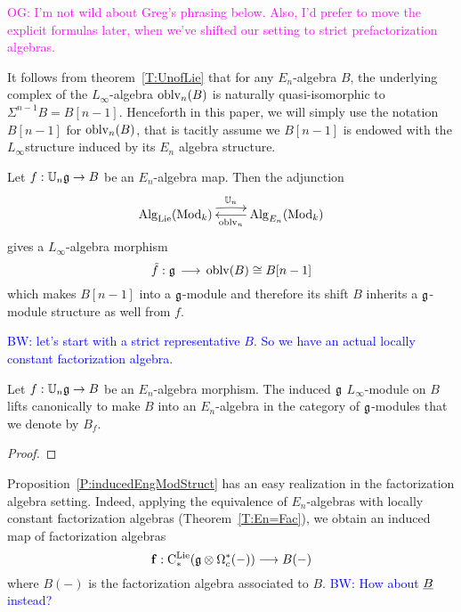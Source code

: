 \documentclass[11pt]{amsart}
\numberwithin{equation}{section}
\def\brian{\textcolor{blue}{BW: }\textcolor{blue}}
\def\owen{\textcolor{magenta}{OG: }\textcolor{magenta}}
\begin{document}
\owen{I'm not wild about Greg's phrasing below. Also, I'd prefer to move the explicit formulas later, when we've shifted our setting to strict prefactorization algebras.}


\begin{rmk}
It follows from theorem~\ref{T:UnofLie} that for any $E_n$-algebra $B$, 
the underlying complex of the $L_\infty$-algebra ${\rm oblv}_n(B)$ is naturally quasi-isomorphic to $\Sigma^{n-1}B = B[n-1]$. 
Henceforth in this paper, we will simply use the notation $B[n-1]$ for ${\rm oblv}_n(B)$, 
that is tacitly assume we $B[n-1]$ is endowed with the $L_\infty$structure induced by its $E_n$ algebra structure.
\end{rmk}

Let  $f:\mathbb U_n \mathfrak g \to B$ be an $E_n$-algebra map. Then the adjunction 
\[
\xymatrix{\Alg_\Lie(\Mod_k) \ar@/^/[r]^{\UU_n} & \ar[l]^{\oblv_n}  \Alg_{E_n}(\Mod_k)}
\]
gives a $L_\infty$-algebra morphism 
\begin{equation}
 \tilde{f}: \mathfrak g \, \longrightarrow \, {\rm oblv}(B)\cong B[n-1]
\end{equation}
which makes $B[n-1]$ into a $\mathfrak g$-module and therefore its shift $B$ inherits a  $\mathfrak g$-module structure as well from $f$.

\brian{let's start with a strict representative $B$. 
So we have an actual locally constant factorization algebra.}

\begin{prp}\label{P:inducedEngModStruct} Let $f:\mathbb U_n \mathfrak g \to B$ be an $E_n$-algebra morphism. 
The induced $\mathfrak g$ $L_\infty$-module on $B$ lifts canonically to make  $B$ into an $E_n$-algebra in the category of $\mathfrak g$-modules that we denote by $B_f$. 
\end{prp}
\begin{proof}
 
\end{proof}
Proposition~\ref{P:inducedEngModStruct} has an easy realization in the factorization algebra setting.
Indeed, applying the equivalence of $E_n$-algebras with locally constant factorization algebras (Theorem~\ref{T:En=Fac}), 
we obtain an induced map of factorization 
algebras 
\begin{equation}\label{eq:DefofFonFaclevel}
 \mathbf{f}: {\rm C}^{\rm Lie}_*( \mathfrak g \otimes \Omega^*_c(-)) \longrightarrow B(-)
\end{equation}
 where $B(-)$ is the factorization algebra associated to $B$.
 \brian{How about $\underline{B}$ instead?}
 
\end{document}
